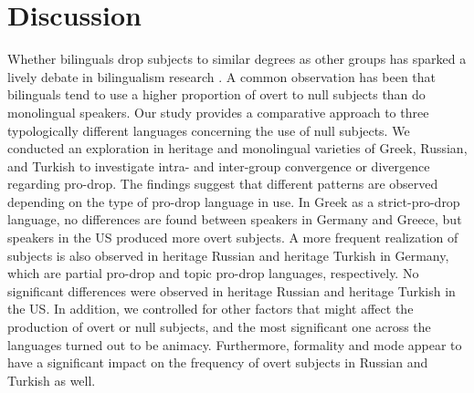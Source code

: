 \documentclass[output=paper,colorlinks,citecolor=brown]{langscibook}
\begin{document}
\section{Discussion} \label{sec:oezsoy:6Discussion}
Whether bilinguals drop subjects to similar degrees as other groups has sparked a lively debate in bilingualism  research \parencite{TsimpliEtAl2004, ArgyriSorace2007, Haznedar2010, Gagarina2012, DubininaPolinsky2013, Ivanova-Sullivan2014, Ivanova-Sullivan2015, Koc2016, AzarEtAl2020}. A common observation has been that bilinguals tend to use a higher proportion of overt to null subjects than do monolingual speakers. Our study provides a comparative approach to three typologically different languages concerning the use of null subjects. We conducted an exploration in heritage and monolingual varieties of Greek, Russian, and Turkish to investigate intra- and inter-group convergence or divergence regarding pro-drop. The findings suggest that different patterns are observed depending on the type of pro-drop language in use. In Greek as a strict-pro-drop language, no differences are found between speakers in Germany and Greece, but speakers in the US produced more overt subjects. A more frequent realization of subjects is also observed in heritage Russian and heritage Turkish in Germany, which are partial pro-drop and topic pro-drop languages, respectively. No significant differences were observed in heritage Russian and heritage Turkish in the US. In addition, we controlled for other factors that might affect the production of overt or null subjects, and the most significant one across the languages turned out to be animacy. Furthermore, formality and mode appear to have a significant impact on the frequency of overt subjects in Russian and Turkish as well.
\end{document}
